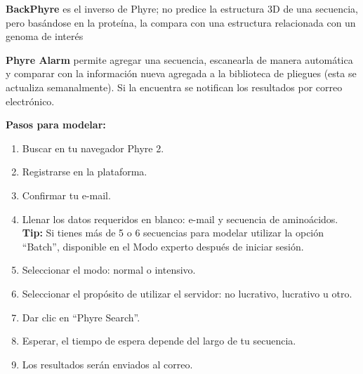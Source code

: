 \documentclass[11pt, letterpaper, spanish]{article}
\begin{document}
{{        \par{\textbf{BackPhyre} es el inverso de Phyre; no predice la estructura 3D de una secuencia, pero basándose en la proteína, la compara con una estructura relacionada con un genoma de interés}
        \par{\textbf{Phyre Alarm} permite agregar una secuencia, escanearla de manera automática y comparar con la información nueva agregada a la biblioteca de pliegues (esta se actualiza semanalmente). Si la encuentra se notifican los resultados por correo electrónico.}
        \par{\textbf{Pasos para modelar:}}
            \begin{enumerate}[1.]
            \item Buscar en tu navegador Phyre 2. 
            \item Registrarse en la plataforma.
            \item Confirmar tu e-mail.
            \item Llenar los datos requeridos en blanco: e-mail y secuencia de aminoácidos. \textbf{Tip:} Si tienes más de 5 o 6 secuencias para modelar utilizar la opción “Batch”, disponible en el Modo experto después de iniciar sesión. 
            \item Seleccionar el modo: normal o intensivo.
            \item Seleccionar el propósito de utilizar el servidor: no lucrativo, lucrativo u otro.
            \item Dar clic en “Phyre Search”.
                   
            \item Esperar, el tiempo de espera depende del largo de tu secuencia.
            \item Los resultados serán enviados al correo.
                   
            \end{enumerate}

}}
\end{document}
